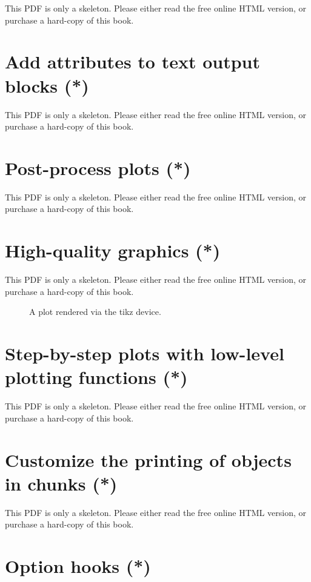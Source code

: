 \documentclass[
  11pt,
]{krantz}
\begin{document}
This PDF is only a skeleton. Please either read the free online HTML version, or purchase a hard-copy of this book.

\section{Add attributes to text output blocks (*)}\label{attr-output}

This PDF is only a skeleton. Please either read the free online HTML version, or purchase a hard-copy of this book.

\section{Post-process plots (*)}\label{fig-process}

This PDF is only a skeleton. Please either read the free online HTML version, or purchase a hard-copy of this book.

\section{High-quality graphics (*)}\label{graphical-device}

This PDF is only a skeleton. Please either read the free online HTML version, or purchase a hard-copy of this book.

\begin{figure}\caption{A plot rendered via the tikz device.}\end{figure}

\section{Step-by-step plots with low-level plotting functions (*)}\label{low-plots}

This PDF is only a skeleton. Please either read the free online HTML version, or purchase a hard-copy of this book.

\section{Customize the printing of objects in chunks (*)}\label{opts-render}

This PDF is only a skeleton. Please either read the free online HTML version, or purchase a hard-copy of this book.

\section{Option hooks (*)}\label{option-hooks}
\end{document}
